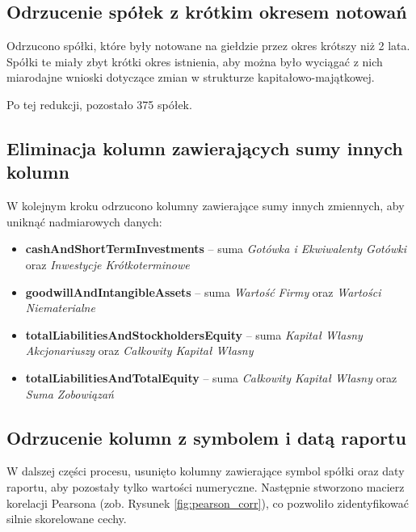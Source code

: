 \documentclass[12pt]{article}
\begin{document}
\subsection{Odrzucenie spółek z krótkim okresem notowań}

Odrzucono spółki, które były notowane na giełdzie przez okres krótszy niż 2 lata. Spółki te miały zbyt krótki okres istnienia, aby można było wyciągać z nich miarodajne wnioski dotyczące zmian w strukturze kapitałowo-majątkowej.

Po tej redukcji, pozostało 375 spółek.

\subsection{Eliminacja kolumn zawierających sumy innych kolumn}

W kolejnym kroku odrzucono kolumny zawierające sumy innych zmiennych, aby uniknąć nadmiarowych danych:
\begin{itemize}
    \item \textbf{cashAndShortTermInvestments} – suma \emph{Gotówka i Ekwiwalenty Gotówki} oraz \emph{Inwestycje Krótkoterminowe}
    \item \textbf{goodwillAndIntangibleAssets} – suma \emph{Wartość Firmy} oraz \emph{Wartości Niematerialne}
    \item \textbf{totalLiabilitiesAndStockholdersEquity} – suma \emph{Kapitał Własny Akcjonariuszy} oraz \emph{Całkowity Kapitał Własny}
    \item \textbf{totalLiabilitiesAndTotalEquity} – suma \emph{Całkowity Kapitał Własny} oraz \emph{Suma Zobowiązań}
\end{itemize}

\subsection{Odrzucenie kolumn z symbolem i datą raportu}

W dalszej części procesu, usunięto kolumny zawierające symbol spółki oraz daty raportu, aby pozostały tylko wartości numeryczne. Następnie stworzono macierz korelacji Pearsona (zob. Rysunek \ref{fig:pearson_corr}), co pozwoliło zidentyfikować silnie skorelowane cechy.
\end{document}
